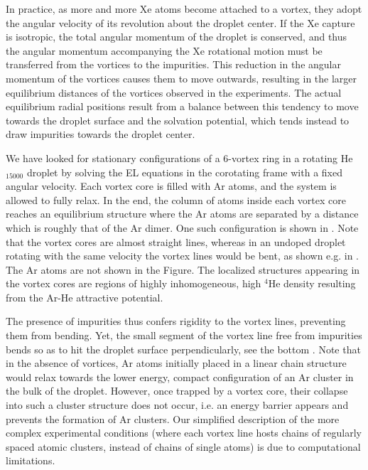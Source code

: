 		In practice, as more and more Xe atoms become
		attached to a vortex, they adopt the angular velocity of its
		revolution about the droplet center. 
		If the Xe capture is isotropic, the total angular momentum of the droplet is conserved, and 
		thus the angular momentum accompanying the Xe rotational motion must be
		transferred from the vortices to the impurities. This reduction in the angular momentum of the
		vortices causes them to move outwards, 
		resulting in the larger
		equilibrium distances of the vortices observed in 
		the experiments. The actual equilibrium radial positions
		result from a balance between this tendency to 
		move towards the droplet surface 
		and the solvation potential, 
		which tends instead to draw impurities towards the droplet
		center.
		
		We have looked for stationary configurations of a 6-vortex ring
		in a rotating He$_{15000}$ droplet by solving the
		EL equations in the corotating frame with a fixed
		angular velocity. Each vortex core is filled with Ar
		atoms, and the system is allowed to fully relax.
		In the end, the column of atoms inside each vortex core reaches an equilibrium structure 
		where the Ar atoms are separated by a distance which  is roughly that of the Ar dimer.
		One such configuration is shown in . Note that 
		the vortex cores are almost straight lines, whereas in an
		undoped droplet rotating with the same velocity 
		the vortex lines would be bent, 
		as shown  e.g. in .
		The Ar atoms are not shown in the Figure.
		The localized structures appearing in the vortex cores are 
		regions of highly inhomogeneous, high  $^4$He density
		resulting from the Ar-He attractive potential.
		
		The presence of impurities thus confers rigidity to the vortex lines,
		preventing them from bending. Yet, the small segment of the vortex line free from impurities bends so as to hit 
		the droplet surface perpendicularly, see the bottom .
		Note that in the absence of vortices, Ar atoms initially placed
		in a linear chain structure would relax towards the lower energy, compact 
		configuration of an Ar cluster in the bulk of the droplet.
		However, once trapped by a vortex core, their collapse 
		into such a cluster structure does not occur,
		i.e. an energy barrier appears and prevents the formation of Ar
		clusters. 
		Our simplified 
		description of the more complex experimental 
		conditions (where each vortex line hosts chains of regularly spaced
		atomic clusters, instead of chains of single atoms)
		is due to computational limitations.
		
